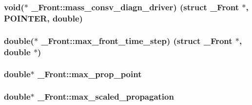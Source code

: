 \subsubsection[{\texorpdfstring{mass\+\_\+consv\+\_\+diagn\+\_\+driver}{mass_consv_diagn_driver}}]{\setlength{\rightskip}{0pt plus 5cm}void($\ast$ \+\_\+\+Front\+::mass\+\_\+consv\+\_\+diagn\+\_\+driver) (struct {\bf \+\_\+\+Front} $\ast$, {\bf P\+O\+I\+N\+T\+ER}, double)}\hypertarget{struct___front_a9378150a7d2998744e7abe8c2c39103d}{}\label{struct___front_a9378150a7d2998744e7abe8c2c39103d}
\subsubsection[{\texorpdfstring{max\+\_\+front\+\_\+time\+\_\+step}{max_front_time_step}}]{\setlength{\rightskip}{0pt plus 5cm}double($\ast$ \+\_\+\+Front\+::max\+\_\+front\+\_\+time\+\_\+step) (struct {\bf \+\_\+\+Front} $\ast$, double $\ast$)}\hypertarget{struct___front_a772920829561a325d0b9f4a4b0f8f58b}{}\label{struct___front_a772920829561a325d0b9f4a4b0f8f58b}
\subsubsection[{\texorpdfstring{max\+\_\+prop\+\_\+point}{max_prop_point}}]{\setlength{\rightskip}{0pt plus 5cm}double$\ast$ \+\_\+\+Front\+::max\+\_\+prop\+\_\+point}\hypertarget{struct___front_a13b0c3dffb133eb570c405f1c07777a3}{}\label{struct___front_a13b0c3dffb133eb570c405f1c07777a3}
\subsubsection[{\texorpdfstring{max\+\_\+scaled\+\_\+propagation}{max_scaled_propagation}}]{\setlength{\rightskip}{0pt plus 5cm}double$\ast$ \+\_\+\+Front\+::max\+\_\+scaled\+\_\+propagation}\hypertarget{struct___front_a66bdf53e92874704a6b2b88856c0453d}{}\label{struct___front_a66bdf53e92874704a6b2b88856c0453d}
